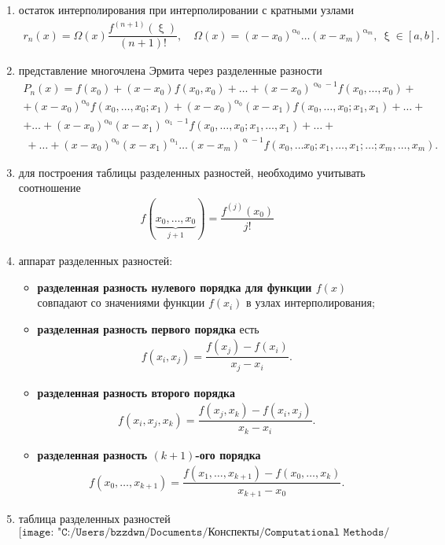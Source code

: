 \documentclass[a4paper, 12pt]{article}
\renewcommand{\alpha}{\upalpha}
\renewcommand{\xi}{\upxi}
\begin{document}
	\begin{enumerate}
		\item остаток интерполирования при интерполировании с кратными узлами 
		\begin{eqnarray}
			r_n(x) = \Omega(x) \dfrac{f^{(n+1)}(\xi)}{(n+1)!},\quad \Omega (x) = (x-x_0)^{\alpha_0}\ldots (x-x_m)^{\alpha_m},\ \xi \in [a,b].
		\end{eqnarray}
		\item представление многочлена Эрмита через разделенные разности
		\begin{multline}
			P_n(x) = f(x_0) + (x-x_0)f(x_0, x_0) + \ldots + (x-x_0)^{\alpha_0-1}f(x_0,\ldots, x_0) + \\ + (x-x_0)^{\alpha_0}f(x_0,\ldots, x_0; x_1)+ (x-x_0)^{\alpha_0}(x-x_1)f(x_0,\ldots, x_0; x_1, x_1) +\ldots +\\+ \ldots + (x-x_0)^{\alpha_0}(x-x_1)^{\alpha_1-1} f(x_0,\ldots, x_0; x_1,\ldots, x_1) + \ldots+ \\\ +\ldots + (x-x_0)^{\alpha_0}(x-x_1)^{\alpha_1}\ldots(x-x_m)^{\alpha-1}f(x_0,\ldots x_0; x_1,\ldots, x_1; \ldots; x_{m},\ldots, x_{m}).
		\end{multline}
		\item для построения таблицы разделенных разностей, необходимо учитывать соотношение 
		\begin{eqnarray}
			f(\underbrace{x_0,\ldots, x_0}_{j+1}) = \dfrac{f^{(j)}(x_0)}{j!}
		\end{eqnarray}
		\item аппарат разделенных разностей:
		\begin{itemize}
			\item \textbf{разделенная разность нулевого порядка для функции $f(x)$} совпадают со значениями функции $f(x_i)$ в узлах интерполирования;
			\item \textbf{разделенная разность первого порядка} есть \begin{eqnarray}
				f(x_i, x_j) = \dfrac{f(x_j) - f(x_i)}{x_j - x_i}.
			\end{eqnarray}
			\item \textbf{разделенная разность второго порядка} \begin{eqnarray}
				f(x_i, x_j, x_k) = \dfrac{f(x_j, x_k) - f(x_i, x_j)}{x_k - x_i}.
			\end{eqnarray}
			\item \textbf{разделенная разность $(k+1)$-ого порядка} \begin{eqnarray}
				f(x_0, \ldots, x_{k+1}) = \dfrac{f(x_1,\ldots, x_{k+1}) - f(x_0,\ldots, x_k)}{x_{k+1} - x_0}.
			\end{eqnarray}
		\end{itemize}
		\item таблица разделенных разностей
		$$
		\texttt{[image: "C:/Users/bzzdwn/Documents/Конспекты/Computational Methods/img9"]}
		$$
	\end{enumerate}
\end{document}

